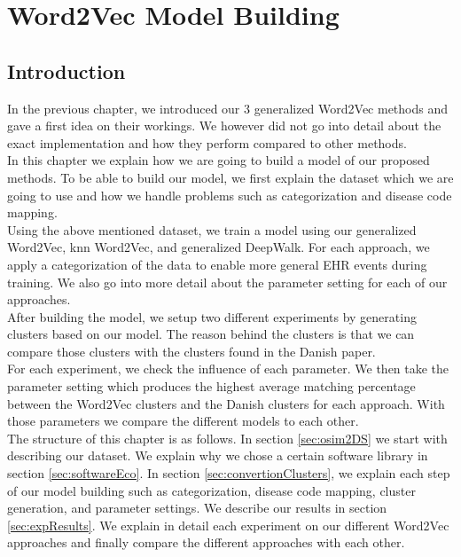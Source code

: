 \graphicspath{ {Implementation/Images/} }


\chapter{Word2Vec Model Building}
\label{cha:implementation}

\section{Introduction}

In the previous chapter, we introduced our $3$ generalized Word2Vec methods and gave a first idea on their workings. We however did not go into detail about the exact implementation and how they perform compared to other methods.  \\

In this chapter we explain how we are going to build a model of our proposed methods. To be able to build our model, we first explain the dataset which we are going to use and how we handle problems such as categorization and disease code mapping. \\
Using the above mentioned dataset, we train a model using our generalized Word2Vec, knn Word2Vec, and generalized DeepWalk. For each approach, we apply a categorization of the data to enable more general EHR events during training. We also go into more detail about the parameter setting for each of our approaches. \\

After building the model, we setup two different experiments by generating clusters based on our model. The reason behind the clusters is that we can compare those clusters with the clusters found in the Danish paper. \\
For each experiment, we check the influence of each parameter. We then take the parameter setting which produces the highest average matching percentage between the Word2Vec clusters and the Danish clusters for each approach. With those parameters we compare the different models to each other. \\

The structure of this chapter is as follows. In section \ref{sec:osim2DS} we start with describing our dataset. We explain why we chose a certain software library in section \ref{sec:softwareEco}. In section \ref{sec:convertionClusters}, we explain each step of our model building such as categorization, disease code mapping, cluster generation, and parameter settings. We describe our results in section \ref{sec:expResults}. We explain in detail each experiment on our different Word2Vec approaches and finally compare the different approaches with each other.


